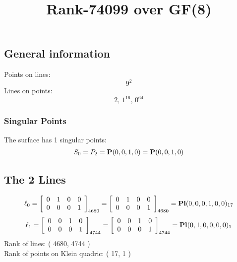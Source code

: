 \documentclass{article}
\newcommand\setTBstruts{\def\T{\rule{0pt}{2.6ex}}%
\def\B{\rule[-1.2ex]{0pt}{0pt}}}
\newcommand{\bP}{{\bf P}}
\begin{document}
 
\setTBstruts



{\allowdisplaybreaks%






\title{Rank-74099 over GF(8)}
\author{}%
\maketitle%
%
{}



\subsection*{General information}
Points on lines:
$$
9^2$$
Lines on points:
$$
2,\,1^{16},\,0^{64}$$
\subsubsection*{Singular Points}
The surface has 1 singular points:\\
\begin{align*}
S_{0} &= P_{2}=\bP(0, 0, 1, 0) = \bP(0, 0, 1, 0)\\
\end{align*}
\subsection*{The 2 Lines}
$$
\ell_{0} = 
\left[
\begin{array}{*{4}{r}}
0 & 1 & 0 & 0\\
0 & 0 & 0 & 1\\
\end{array}
\right]
_{4680}
=
\left[
\begin{array}{*{4}c}
0  & 1  & 0  & 0\\
0  & 0  & 0  & 1\\
\end{array}
\right]_{4680}
={\rm\bf Pl}(0,0,0,1,0,0 )_{17}$$
$$
\ell_{1} = 
\left[
\begin{array}{*{4}{r}}
0 & 0 & 1 & 0\\
0 & 0 & 0 & 1\\
\end{array}
\right]
_{4744}
=
\left[
\begin{array}{*{4}c}
0  & 0  & 1  & 0\\
0  & 0  & 0  & 1\\
\end{array}
\right]_{4744}
={\rm\bf Pl}(0,1,0,0,0,0 )_{1}$$
Rank of lines: ( 4680, 4744 )\\
Rank of points on Klein quadric: ( 17, 1 )\\
}
\end{document}
